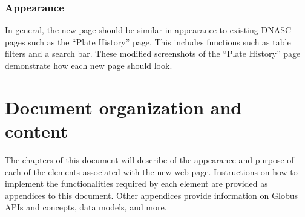 \subsubsection{Appearance}
In general, the new page should be similar in appearance to existing DNASC pages such as 
the ``Plate History'' page. This includes functions such as table filters and a search bar. 
These modified screenshots of the ``Plate History'' page demonstrate how each new page 
should look.

\section{Document organization and content}

The chapters of this document will describe of the appearance and purpose of each of the
elements associated with the new web page. Instructions on how to implement the 
functionalities required by each element are provided as appendices to this document. 
Other appendices provide information on Globus APIs and concepts, data models, and more.
